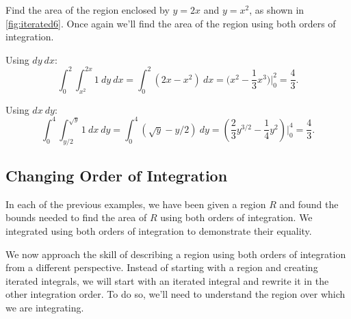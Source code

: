 \begin{example}\label{ex_iterated6}
Find the area of the region enclosed by $y=2x$ and $y=x^2$, as shown in \autoref{fig:iterated6}.
%
\solution
Once again we'll find the area of the region using both orders of integration. 

Using $dy\ dx$:
\[
\int_0^2\int_{x^2}^{2x}1\ dy \ dx = \int_0^2(2x-x^2)\ dx
= \bigl(x^2-\frac13x^3\bigr)\Big|_0^2 = \frac43.
\]

Using $dx\ dy$:
\[
\int_0^4\int_{y/2}^{\sqrt{y}} 1\ dx\ dy = \int_0^4 (\sqrt{y}-y/2)\ dy
= \left(\frac23y^{3/2} - \frac14y^2\right)\Big|_0^4 = \frac43.
\]
\end{example}

\subsection{Changing Order of Integration}

In each of the previous examples, we have been given a region $R$ and found the bounds needed to find the area of $R$ using both orders of integration. We integrated using both orders of integration to demonstrate their equality.

We now approach the skill of describing a region using both orders of integration from a different perspective. Instead of starting with a region and creating iterated integrals, we will start with an iterated integral and rewrite it in the other integration order. To do so, we'll need to understand the region over which we are integrating.

